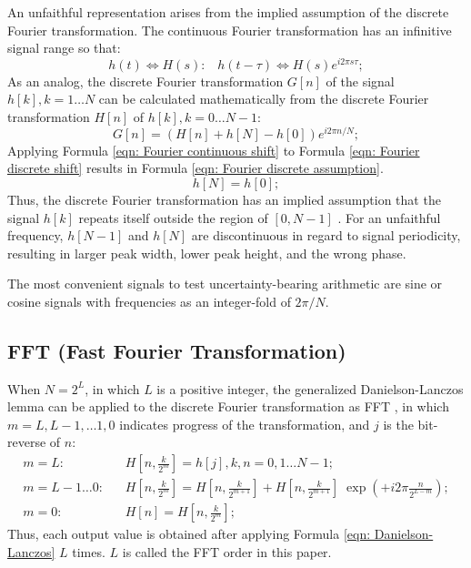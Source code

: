 \documentclass[twoside]{article}
\numberwithin{equation}{section}
\newcommand{\eqspace}{\;\;\;}
\begin{document}
An unfaithful representation arises from the implied assumption of the discrete Fourier transformation.  
The continuous Fourier transformation has an infinitive signal range so that:
\begin{equation}
\label{eqn: Fourier continuous shift}
h(t) \Leftrightarrow H(s): \eqspace h(t - \tau) \Leftrightarrow H(s) e^{i 2\pi s \tau};
\end{equation}
As an analog, the discrete Fourier transformation $G[n]$ of the signal $h[k], k = 1 \dots N$ can be calculated mathematically from the discrete Fourier transformation $H[n]$ of $h[k], k = 0\dots N-1$:
\begin{equation}
\label{eqn: Fourier discrete shift}
G[n] = (H[n] + h[N] - h[0]) e^{i 2\pi n/N};
\end{equation}
Applying Formula \eqref{eqn: Fourier continuous shift} to Formula \eqref{eqn: Fourier discrete shift} results in Formula \eqref{eqn: Fourier discrete assumption}.
\begin{equation}
\label{eqn: Fourier discrete assumption}
h[N] = h[0];
\end{equation}
Thus, the discrete Fourier transformation has an implied assumption that the signal $h[k]$ repeats itself outside the region of $[0, N-1]$ \cite{Numerical_DFT}.  
For an unfaithful frequency, $h[N-1]$ and $h[N]$ are discontinuous in regard to signal periodicity, resulting in larger peak width, lower peak height, and the wrong phase.  

The most convenient signals to test uncertainty-bearing arithmetic are sine or cosine signals with frequencies as an integer-fold of $2\pi/N$.  
 

\subsection{FFT (Fast Fourier Transformation) \cite{Prev_Precision_Arithmetic}}

When $N = 2^{L}$, in which $L$ is a positive integer, the generalized Danielson-Lanczos lemma \cite{Numerical_Recipes} can be applied to the discrete Fourier transformation as FFT \cite{Numerical_Recipes}, in which $m = L, L-1,\dots 1,0$ indicates progress of the transformation, and $j$ is the bit-reverse of $n$:
\begin{align}
m=L: \eqspace & H[n,\frac{k}{2^{m}}] = h[j],  k,n = 0,1\dots N-1; \\
\label{eqn: Danielson-Lanczos}
m=L-1 \dots 0: \eqspace & H[n,\frac{k}{2^{m}}] = H[n,\frac{k}{2^{m+1}}] + H[n,\frac{k}{2^{m+1}}]\; \exp{(+i 2\pi \frac{n}{2^{L-m}})}; \\
m=0: \eqspace & H[n] = H[n,\frac{k}{2^{m}}];
\end{align}
Thus, each output value is obtained after applying Formula \eqref{eqn: Danielson-Lanczos} $L$ times.  
$L$ is called the FFT order in this paper.  
\end{document}
